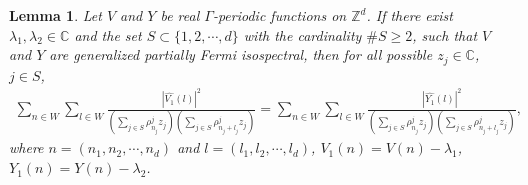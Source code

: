 \documentclass[12pt,letterpaper]{amsart}
\newtheorem{lemma}{Lemma}[section]
\newcommand{\abs}[1]{\left\lvert #1 \right\rvert}
\def\C{{\mathbb C}}
\def\Z{{\mathbb Z}}
\begin{document}
\begin{lemma}Let $V$ and $Y$ be real $\Gamma$-periodic functions on $\Z^d$. If there exist $\lambda_1,\lambda_2\in\C$ and the set $S\subset\{1,2,\cdots,d\}$ with the cardinality $\# S\geq 2$, such that $V$ and $Y$ {are generalized partially Fermi isospectral},
then for all possible $z_j\in\C$, $j\in S$,
\begin{align}\label{sumv2y2}
\sum_{n\in W}\sum_{l\in W}\frac{\abs{\hat{V_1}(l)}^2}{\left(\sum_{j\in S}\rho^j_{n_j}z_j\right)\left(\sum_{j\in S}\rho^j_{n_j+l_j}z_j\right)}=\sum_{n\in W}\sum_{l\in W}\frac{\abs{\hat{Y_1}(l)}^2}{\left(\sum_{j\in S}\rho^j_{n_j}z_j\right)\left(\sum_{j\in S}\rho^j_{n_j+l_j}z_j\right)},
\end{align}
where $n=(n_1,n_2,\cdots,n_d)$ and $l=(l_1,l_2,\cdots,l_d)$, $V_1(n)=V(n)-\lambda_1$, $Y_1(n)=Y(n)-\lambda_2$.
\end{lemma}
\end{document}
